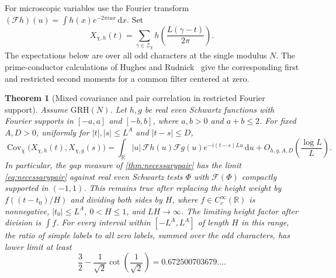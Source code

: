 \documentclass[11pt,a4paper]{article}
\numberwithin{equation}{section}
\newtheorem{theorem}{Theorem}[section]
\newcommand{\grh}{\mathrm{GRH}}
\newcommand{\ud}{\mathrm d}
\begin{document}
For microscopic variables use the Fourier transform
$(\mathcal F h)(u)=\int h(x)e^{-2\pi iux}\,\ud x$. Set
\[
 X_{\chi,h}(t)=\sum_{\gamma\in\mathcal Z_\chi}
                  h\!\left(\frac{L(\gamma-t)}{2\pi}\right).
\]
The expectations below are over all odd characters at the
single modulus $N$. The prime-conductor calculations
of Hughes and Rudnick~\cite{HughesRudnick} give the
corresponding first and restricted second moments for a
common filter centered at zero.

\begin{theorem}[Mixed covariance and pair correlation in restricted Fourier support]
\label{thm:restrictedzeropairs}
Assume $\grh(N)$. Let $h,g$ be real even Schwartz functions
with Fourier supports in $[-a,a]$ and $[-b,b]$, where
$a,b>0$ and $a+b\le2$. For fixed $A,D>0$, uniformly for
$|t|,|s|\le L^A$ and $|t-s|\le D$,
\begin{equation}
 \operatorname{Cov}_{\chi}\bigl(X_{\chi,h}(t),X_{\chi,g}(s)\bigr)
  =\int_{\mathbb R}|u|\,\mathcal Fh(u)\mathcal Fg(u)
                         e^{-i(t-s)Lu}\,\ud u
       +O_{h,g,A,D}\!\left(\frac{\log L}{L}\right).
 \label{eq:restrictedcovariance}
\end{equation}
In particular, the gap measure of \cref{thm:necessarypair}
has the limit \eqref{eq:necessarypair} against real even
Schwartz tests $\Phi$ with $\mathcal F(\Phi)$ compactly
supported in $(-1,1)$. This remains true after replacing
the height weight by $f((t-t_0)/H)$ and dividing both sides
by $H$, where $f\in C_c^\infty(\mathbb R)$ is nonnegative,
$|t_0|\le L^A$, $0<H\le1$, and $LH\to\infty$.
The limiting height factor after division is $\int f$.
For every interval within $[-L^A,L^A]$ of length $H$ in
this range, the ratio of simple labels to all zero labels,
summed over the odd characters, has lower limit at least
\[
 \frac32-\frac1{\sqrt2}\cot\!\left(\frac1{\sqrt2}\right)
     =0.672500703679\ldots.
\]
\end{theorem}
\end{document}
